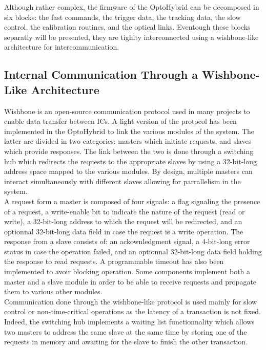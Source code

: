     Although rather complex, the firmware of the OptoHybrid can be decomposed in six blocks: the fast commands, the trigger data, the tracking data, the slow control, the calibration routines, and the optical links. Eventough these blocks separatly will be presented, they are tighlty interconnected using a wishbone-like architecture for intercommunication.

    \subsection{Internal Communication Through a Wishbone-Like Architecture}

      Wishbone is an open-source communication protocol used in many projects to enable data transfer between ICs. A light version of the protocol has been implemented in the OptoHybrid to link the various modules of the system. The latter are divided in two categories: masters which initiate requests, and slaves which provide responses. The link between the two is done through a switching hub which redirects the requests to the appropriate slaves by using a 32-bit-long address space mapped to the various modules. By design, multiple masters can interact simultaneously with different slaves allowing for parrallelism in the system. \\

      A request form a master is composed of four signals: a flag signaling the presence of a request, a write-enable bit to indicate the nature of the request (read or write), a 32-bit-long address to which the request will be redirected, and an optionnal 32-bit-long data field in case the request is a write operation. The response from a slave consists of: an ackownledgment signal, a 4-bit-long error status in case the operation failed, and an optionnal 32-bit-long data field holding the response to read requests. A programmable timeout has also been implemented to avoir blocking operation. Some components implement both a master and a slave module in order to be able to receive requests and propagate them to various other modules. \\

      Communication done through the wishbone-like protocol is used mainly for slow control or non-time-critical operations as the latency of a transaction is not fixed. Indeed, the switching hub implements a waiting list functionnality which allows two masters to address the same slave at the same time by storing one of the requests in memory and awaiting for the slave to finish the other transaction.

